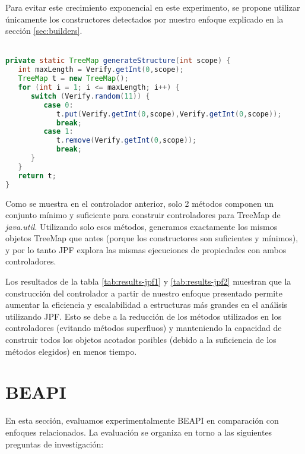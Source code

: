 
Para evitar este crecimiento exponencial en este experimento, se propone utilizar únicamente los constructores detectados por nuestro enfoque explicado en la sección \ref{sec:builders}.
\\
\\
\begin{lstlisting}[caption={Controlador con métodos constructores},label={lst:driverBLD},language=Java,captionpos=b]
private static TreeMap generateStructure(int scope) {
   int maxLength = Verify.getInt(0,scope);
   TreeMap t = new TreeMap();
   for (int i = 1; i <= maxLength; i++) {
      switch (Verify.random(11)) {
         case 0:
            t.put(Verify.getInt(0,scope),Verify.getInt(0,scope));
            break;
         case 1:
            t.remove(Verify.getInt(0,scope));
            break;						
      }
   }
   return t;
}
\end{lstlisting}

Como se muestra en el controlador anterior, solo 2 métodos componen un conjunto mínimo y suficiente para construir controladores para TreeMap de \textit{java.util}. Utilizando solo esos métodos, generamos exactamente los mismos objetos TreeMap que antes (porque los constructores son suficientes y mínimos), y por lo tanto JPF explora las mismas ejecuciones de propiedades con ambos controladores.

Los resultados de la tabla \ref{tab:results-jpf1} y \ref{tab:results-jpf2} muestran que la construcción del controlador a partir de nuestro enfoque presentado permite aumentar la eficiencia y escalabilidad a estructuras más grandes en el análisis utilizando JPF. Esto se debe a la reducción de los métodos utilizados en los controladores (evitando métodos superfluos) y manteniendo la capacidad de construir todos los objetos acotados posibles (debido a la suficiencia de los métodos elegidos) en menos tiempo.





\section{BEAPI}
En esta sección, evaluamos experimentalmente \textsf{BEAPI} en comparación con enfoques relacionados. La evaluación se organiza en torno a las siguientes preguntas de investigación:


